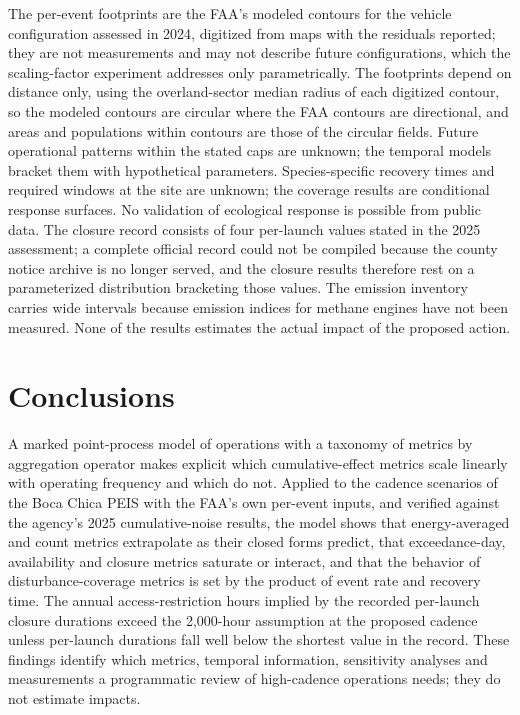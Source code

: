 \documentclass[preprint,12pt,authoryear]{elsarticle}
\begin{document}
The per-event footprints are the FAA's modeled contours for the vehicle configuration assessed in 2024, digitized from maps with the residuals reported; they are not measurements and may not describe future configurations, which the scaling-factor experiment addresses only parametrically. The footprints depend on distance only, using the overland-sector median radius of each digitized contour, so the modeled contours are circular where the FAA contours are directional, and areas and populations within contours are those of the circular fields. Future operational patterns within the stated caps are unknown; the temporal models bracket them with hypothetical parameters. Species-specific recovery times and required windows at the site are unknown; the coverage results are conditional response surfaces. No validation of ecological response is possible from public data. The closure record consists of four per-launch values stated in the 2025 assessment; a complete official record could not be compiled because the county notice archive is no longer served, and the closure results therefore rest on a parameterized distribution bracketing those values. The emission inventory carries wide intervals because emission indices for methane engines have not been measured. None of the results estimates the actual impact of the proposed action.

\section{Conclusions}

A marked point-process model of operations with a taxonomy of metrics by aggregation operator makes explicit which cumulative-effect metrics scale linearly with operating frequency and which do not. Applied to the cadence scenarios of the Boca Chica PEIS with the FAA's own per-event inputs, and verified against the agency's 2025 cumulative-noise results, the model shows that energy-averaged and count metrics extrapolate as their closed forms predict, that exceedance-day, availability and closure metrics saturate or interact, and that the behavior of disturbance-coverage metrics is set by the product of event rate and recovery time. The annual access-restriction hours implied by the recorded per-launch closure durations exceed the 2,000-hour assumption at the proposed cadence unless per-launch durations fall well below the shortest value in the record. These findings identify which metrics, temporal information, sensitivity analyses and measurements a programmatic review of high-cadence operations needs; they do not estimate impacts.
\end{document}
